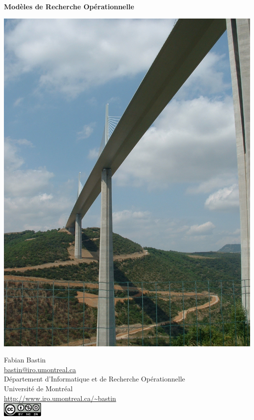 \documentclass[11pt]{book}%
\theoremstyle{plain}
\numberwithin{equation}{section}
\begin{document}
\shorthandoff{:}

\frontmatter

\thispagestyle{empty}

\begin{center}
{\Huge \bf \sc Modèles de Recherche Opérationnelle}

\mbox{}

\includegraphics[width=0.7\linewidth]{dscf0035.jpg}
		
\mbox{}

{\Large Fabian Bastin}\\
{\normalsize \url{bastin@iro.umontreal.ca}}
\mbox{}\\Département d'Informatique et de Recherche Opérationnelle\\
Université de Montréal\\
\url{http://www.iro.umontreal.ca/~bastin}\\
\includegraphics[width=2cm]{cc.png}
\end{center}

\pagebreak{}

\thispagestyle{empty}
\end{document}
